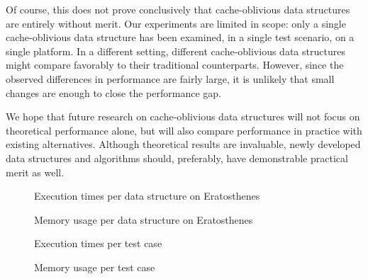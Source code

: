 \documentclass{acm_proc_article-sp}
\begin{document}
Of course, this does not prove conclusively that cache-oblivious data structures
are entirely without merit. Our experiments are limited in scope: only a single
cache-oblivious data structure has been examined, in a single test scenario,
on a single platform.
In a different setting, different cache-oblivious data structures might compare
favorably to their traditional counterparts.
However, since the observed differences in performance are fairly large,
it is unlikely that small changes are enough to close the performance gap.

We hope that future research on cache-oblivious data structures will not focus
on theoretical performance alone, but will also compare performance in practice
with existing alternatives.
Although theoretical results are invaluable, newly developed data structures and
algorithms should, preferably, have demonstrable practical merit as well.




\begin{figure}[p]
\centering
{}
\caption{Execution times per data structure on Eratosthenes}
\label{fig-eratosthenes-wctime}
\end{figure}

\begin{figure}[p]
\centering
{}
\caption{Memory usage per data structure on Eratosthenes}
\label{fig-eratosthenes-vss}
\end{figure}

\begin{figure}[p]
\centering
{}
\caption{Execution times per test case}
\label{fig-wctime}
\end{figure}

\begin{figure}[p]
\centering
{}
\caption{Memory usage per test case}
\label{fig-vss}
\end{figure}
\end{document}
